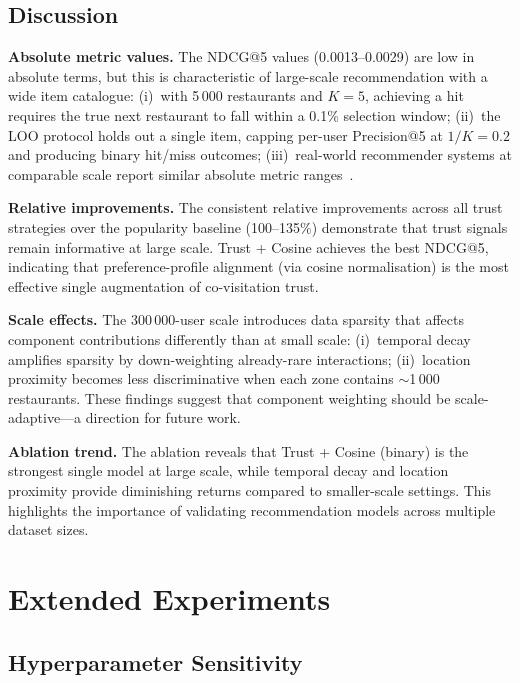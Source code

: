 \documentclass[conference]{IEEEtran}
\begin{document}
\subsection{Discussion}

\textbf{Absolute metric values.}
The NDCG@5 values (0.0013--0.0029) are low in absolute terms, but this
is characteristic of large-scale recommendation with a wide item
catalogue: (i)~with 5\,000 restaurants and $K=5$, achieving a hit
requires the true next restaurant to fall within a 0.1\% selection
window; (ii)~the LOO protocol holds out a single item, capping per-user
Precision@5 at $1/K = 0.2$ and producing binary hit/miss outcomes;
(iii)~real-world recommender systems at comparable scale report similar
absolute metric ranges~\cite{he2017neural}.

\textbf{Relative improvements.}
The consistent relative improvements across all trust strategies over the
popularity baseline (100--135\%) demonstrate that trust signals remain
informative at large scale.  Trust + Cosine achieves the best NDCG@5,
indicating that preference-profile alignment (via cosine normalisation)
is the most effective single augmentation of co-visitation trust.

\textbf{Scale effects.}
The 300\,000-user scale introduces data sparsity that affects component
contributions differently than at small scale: (i)~temporal decay
amplifies sparsity by down-weighting already-rare interactions;
(ii)~location proximity becomes less discriminative when each zone
contains $\sim$1\,000 restaurants.  These findings suggest that
component weighting should be scale-adaptive---a direction for future
work.

\textbf{Ablation trend.}
The ablation reveals that Trust + Cosine (binary) is the strongest
single model at large scale, while temporal decay and location proximity
provide diminishing returns compared to smaller-scale settings.  This
highlights the importance of validating recommendation models across
multiple dataset sizes.


\section{Extended Experiments}
\label{sec:analysis}

\subsection{Hyperparameter Sensitivity}
\label{sec:sensitivity}
\end{document}
